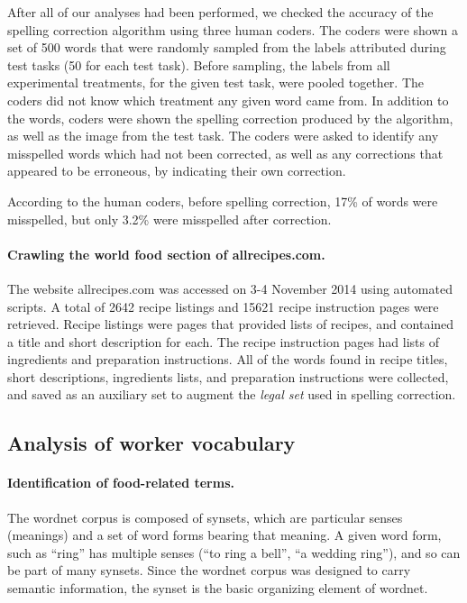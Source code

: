 \documentclass[12pt]{article}
\begin{document}
	After all of our analyses had been performed, we checked the accuracy of 
	the spelling correction algorithm using three human coders.  The coders
	were shown a set of 
	500 words that were randomly sampled from the labels attributed during 
	test tasks (50 for each test task).  Before sampling, the labels from all
	experimental treatments, for the given test task, were pooled together.
	The coders did not know which treatment any given word came from.  
	In addition to the words, coders were shown the spelling correction 
	produced by the algorithm, as well as the image from the test task.
	The coders were asked to identify any misspelled words which had not 
	been corrected, as well as any corrections that appeared to be erroneous,
	by indicating their own correction.

	According to the human coders, before spelling correction, 17\% of words 
	were misspelled, but only 3.2\% were misspelled after correction.

	\paragraph{Crawling the world food section of allrecipes.com.}
	The website allrecipes.com was accessed on 3-4 November 2014 using 
	automated scripts.  A total of 2642 recipe listings and 15621 recipe
	instruction pages were retrieved.  Recipe listings were pages that 
	provided lists of recipes, and contained a title and short description 
	for each.  
	The recipe instruction pages had lists of ingredients and preparation 
	instructions.  All of the words found in recipe titles, short
	descriptions, ingredients lists, and preparation instructions were
	collected, and saved as an auxiliary set to augment the \textit{legal set}
	used in spelling correction.
	

\subsection*{Analysis of worker vocabulary}

\paragraph{Identification of food-related terms.}
The wordnet corpus is composed of synsets, which are particular senses 
(meanings) and a set of word forms bearing that meaning. A given word form, 
such as ``ring'' has multiple senses (``to ring a bell'', ``a wedding ring''),
and so can be part of many synsets.  Since the wordnet corpus was designed
to carry semantic information, the synset is the basic organizing element
of wordnet.
\end{document}
